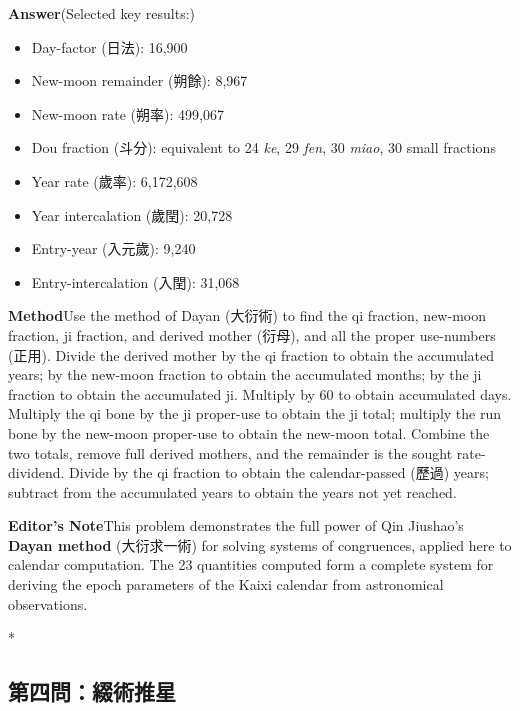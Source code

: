 \documentclass[11pt,a4paper]{article}
\newcommand{\DaEN}{\textbf{\color{headcolor}Answer}}
\newcommand{\ShuEN}{\textbf{\color{headcolor}Method}}
\newcommand{\AnEN}{\textbf{\color{headcolor}Editor's Note}}
\begin{document}
\vspace{0.5em}
\DaEN{}\quad (Selected key results:)
\begin{itemize}[noitemsep,topsep=0pt]
  \item Day-factor (日法): 16,900
  \item New-moon remainder (朔餘): 8,967
  \item New-moon rate (朔率): 499,067
  \item Dou fraction (斗分): equivalent to 24 \textit{ke}, 29 \textit{fen}, 30 \textit{miao}, 30 small fractions
  \item Year rate (歲率): 6,172,608
  \item Year intercalation (歲閏): 20,728
  \item Entry-year (入元歲): 9,240
  \item Entry-intercalation (入閏): 31,068
\end{itemize}

\vspace{0.5em}
\ShuEN{}\quad Use the method of Dayan (大衍術) to find the qi fraction, new-moon fraction, ji fraction, and derived mother (衍母), and all the proper use-numbers (正用). Divide the derived mother by the qi fraction to obtain the accumulated years; by the new-moon fraction to obtain the accumulated months; by the ji fraction to obtain the accumulated ji. Multiply by 60 to obtain accumulated days. Multiply the qi bone by the ji proper-use to obtain the ji total; multiply the run bone by the new-moon proper-use to obtain the new-moon total. Combine the two totals, remove full derived mothers, and the remainder is the sought rate-dividend. Divide by the qi fraction to obtain the calendar-passed (歷過) years; subtract from the accumulated years to obtain the years not yet reached.

\vspace{0.5em}
\AnEN{}\quad This problem demonstrates the full power of Qin Jiushao's \textbf{Dayan method} (大衍求一術) for solving systems of congruences, applied here to calendar computation. The 23 quantities computed form a complete system for deriving the epoch parameters of the Kaixi calendar from astronomical observations.

\newpage

\switchcolumn[0]*
\subsection*{第四問：綴術推星}
\end{document}
